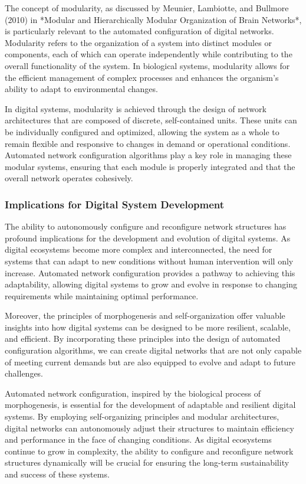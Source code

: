 \documentclass[12pt,twoside]{article}
\begin{document}
The concept of modularity, as discussed by Meunier, Lambiotte, and Bullmore (2010) in *Modular and Hierarchically Modular Organization of Brain Networks*, is particularly relevant to the automated configuration of digital networks. Modularity refers to the organization of a system into distinct modules or components, each of which can operate independently while contributing to the overall functionality of the system. In biological systems, modularity allows for the efficient management of complex processes and enhances the organism’s ability to adapt to environmental changes.

In digital systems, modularity is achieved through the design of network architectures that are composed of discrete, self-contained units. These units can be individually configured and optimized, allowing the system as a whole to remain flexible and responsive to changes in demand or operational conditions. Automated network configuration algorithms play a key role in managing these modular systems, ensuring that each module is properly integrated and that the overall network operates cohesively.

\subsubsection{Implications for Digital System Development}

The ability to autonomously configure and reconfigure network structures has profound implications for the development and evolution of digital systems. As digital ecosystems become more complex and interconnected, the need for systems that can adapt to new conditions without human intervention will only increase. Automated network configuration provides a pathway to achieving this adaptability, allowing digital systems to grow and evolve in response to changing requirements while maintaining optimal performance.

Moreover, the principles of morphogenesis and self-organization offer valuable insights into how digital systems can be designed to be more resilient, scalable, and efficient. By incorporating these principles into the design of automated configuration algorithms, we can create digital networks that are not only capable of meeting current demands but are also equipped to evolve and adapt to future challenges.

Automated network configuration, inspired by the biological process of morphogenesis, is essential for the development of adaptable and resilient digital systems. By employing self-organizing principles and modular architectures, digital networks can autonomously adjust their structures to maintain efficiency and performance in the face of changing conditions. As digital ecosystems continue to grow in complexity, the ability to configure and reconfigure network structures dynamically will be crucial for ensuring the long-term sustainability and success of these systems.
\end{document}
